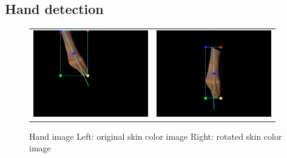 \subsection{Hand detection}
\begin{figure}
 \centering
 \begin{tabular}{cc}
  \includegraphics[width=5cm]{fig5/ex.png} &
  \includegraphics[width=5cm]{fig5/exng.png}
 \end{tabular}
 \caption{Hand image Left: original skin color image Right: rotated skin color image}
 \label{fig:handim}
\end{figure}
